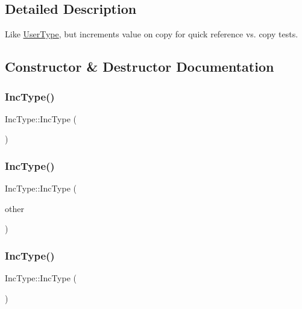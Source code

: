 \subsection{Detailed Description}
Like \mbox{\hyperlink{class_user_type}{User\+Type}}, but increments {\ttfamily value} on copy for quick reference vs. copy tests. 

\subsection{Constructor \& Destructor Documentation}
\mbox{\label{class_inc_type_aa93ab14b8909ae8963ae2e6dc2cc4bd2}} 
\subsubsection{\texorpdfstring{IncType()}{IncType()}\hspace{0.1cm}{\footnotesize\ttfamily [1/3]}}
{\footnotesize\ttfamily Inc\+Type\+::\+Inc\+Type (\begin{DoxyParamCaption}{ }\end{DoxyParamCaption})\hspace{0.3cm}{\ttfamily [default]}}

\mbox{\label{class_inc_type_a1b4408a83f7eecd3d558b3b4b840d20b}} 
\subsubsection{\texorpdfstring{IncType()}{IncType()}\hspace{0.1cm}{\footnotesize\ttfamily [2/3]}}
{\footnotesize\ttfamily Inc\+Type\+::\+Inc\+Type (\begin{DoxyParamCaption}\item[{const \mbox{\hyperlink{class_inc_type}{Inc\+Type}} \&}]{other }\end{DoxyParamCaption})\hspace{0.3cm}{\ttfamily [inline]}}

\mbox{\label{class_inc_type_afbbcb56ad21de4be1dcd0be20323edb4}} 
\subsubsection{\texorpdfstring{IncType()}{IncType()}\hspace{0.1cm}{\footnotesize\ttfamily [3/3]}}
{\footnotesize\ttfamily Inc\+Type\+::\+Inc\+Type (\begin{DoxyParamCaption}\item[{\mbox{\hyperlink{class_inc_type}{Inc\+Type}} \&\&}]{ }\end{DoxyParamCaption})\hspace{0.3cm}{\ttfamily [delete]}}



